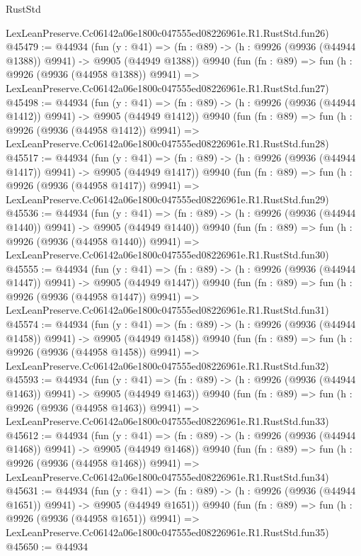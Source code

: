 \begin{lexlean}{RustStd}
\begin{coremodule}
    LexLeanPreserve.Cc06142a06e1800c047555ed08226961e.R1.RustStd.fun26)
@45479 := @44934
    (fun (y : @41) =>
    (fn : @89) -> (h : @9926 (@9936 (@44944 @1388)) @9941) -> @9905 (@44949 @1388))
    @9940
    (fun (fn : @89) =>
    fun (h : @9926 (@9936 (@44958 @1388)) @9941) =>
    LexLeanPreserve.Cc06142a06e1800c047555ed08226961e.R1.RustStd.fun27)
@45498 := @44934
    (fun (y : @41) =>
    (fn : @89) -> (h : @9926 (@9936 (@44944 @1412)) @9941) -> @9905 (@44949 @1412))
    @9940
    (fun (fn : @89) =>
    fun (h : @9926 (@9936 (@44958 @1412)) @9941) =>
    LexLeanPreserve.Cc06142a06e1800c047555ed08226961e.R1.RustStd.fun28)
@45517 := @44934
    (fun (y : @41) =>
    (fn : @89) -> (h : @9926 (@9936 (@44944 @1417)) @9941) -> @9905 (@44949 @1417))
    @9940
    (fun (fn : @89) =>
    fun (h : @9926 (@9936 (@44958 @1417)) @9941) =>
    LexLeanPreserve.Cc06142a06e1800c047555ed08226961e.R1.RustStd.fun29)
@45536 := @44934
    (fun (y : @41) =>
    (fn : @89) -> (h : @9926 (@9936 (@44944 @1440)) @9941) -> @9905 (@44949 @1440))
    @9940
    (fun (fn : @89) =>
    fun (h : @9926 (@9936 (@44958 @1440)) @9941) =>
    LexLeanPreserve.Cc06142a06e1800c047555ed08226961e.R1.RustStd.fun30)
@45555 := @44934
    (fun (y : @41) =>
    (fn : @89) -> (h : @9926 (@9936 (@44944 @1447)) @9941) -> @9905 (@44949 @1447))
    @9940
    (fun (fn : @89) =>
    fun (h : @9926 (@9936 (@44958 @1447)) @9941) =>
    LexLeanPreserve.Cc06142a06e1800c047555ed08226961e.R1.RustStd.fun31)
@45574 := @44934
    (fun (y : @41) =>
    (fn : @89) -> (h : @9926 (@9936 (@44944 @1458)) @9941) -> @9905 (@44949 @1458))
    @9940
    (fun (fn : @89) =>
    fun (h : @9926 (@9936 (@44958 @1458)) @9941) =>
    LexLeanPreserve.Cc06142a06e1800c047555ed08226961e.R1.RustStd.fun32)
@45593 := @44934
    (fun (y : @41) =>
    (fn : @89) -> (h : @9926 (@9936 (@44944 @1463)) @9941) -> @9905 (@44949 @1463))
    @9940
    (fun (fn : @89) =>
    fun (h : @9926 (@9936 (@44958 @1463)) @9941) =>
    LexLeanPreserve.Cc06142a06e1800c047555ed08226961e.R1.RustStd.fun33)
@45612 := @44934
    (fun (y : @41) =>
    (fn : @89) -> (h : @9926 (@9936 (@44944 @1468)) @9941) -> @9905 (@44949 @1468))
    @9940
    (fun (fn : @89) =>
    fun (h : @9926 (@9936 (@44958 @1468)) @9941) =>
    LexLeanPreserve.Cc06142a06e1800c047555ed08226961e.R1.RustStd.fun34)
@45631 := @44934
    (fun (y : @41) =>
    (fn : @89) -> (h : @9926 (@9936 (@44944 @1651)) @9941) -> @9905 (@44949 @1651))
    @9940
    (fun (fn : @89) =>
    fun (h : @9926 (@9936 (@44958 @1651)) @9941) =>
    LexLeanPreserve.Cc06142a06e1800c047555ed08226961e.R1.RustStd.fun35)
@45650 := @44934

\end{coremodule}
\end{lexlean}
